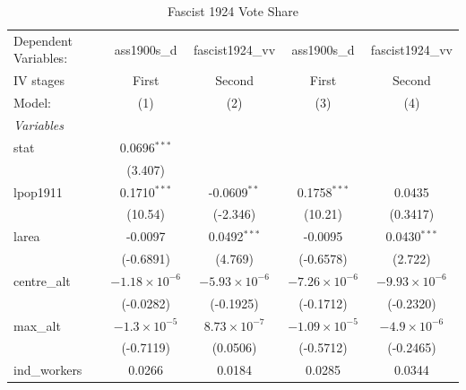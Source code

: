 
\begin{table}[htbp]
   \caption{Fascist 1924 Vote Share}
   \centering
   \begin{tabular}{lcccc}
      \tabularnewline \midrule \midrule
      Dependent Variables:             & ass1900s\_d            & fascist1924\_vv        & ass1900s\_d            & fascist1924\_vv\\   
      IV stages                        & First                  & Second                 & First                  & Second \\   
      Model:                           & (1)                    & (2)                    & (3)                    & (4)\\  
      \midrule
      \emph{Variables}\\
      stat                             & 0.0696$^{***}$         &                        &                        &   \\   
                                       & (3.407)                &                        &                        &   \\   
      lpop1911                         & 0.1710$^{***}$         & -0.0609$^{**}$         & 0.1758$^{***}$         & 0.0435\\   
                                       & (10.54)                & (-2.346)               & (10.21)                & (0.3417)\\   
      larea                            & -0.0097                & 0.0492$^{***}$         & -0.0095                & 0.0430$^{***}$\\   
                                       & (-0.6891)              & (4.769)                & (-0.6578)              & (2.722)\\   
      centre\_alt                      & $-1.18\times 10^{-6}$  & $-5.93\times 10^{-6}$  & $-7.26\times 10^{-6}$  & $-9.93\times 10^{-6}$\\    
                                       & (-0.0282)              & (-0.1925)              & (-0.1712)              & (-0.2320)\\   
      max\_alt                         & $-1.3\times 10^{-5}$   & $8.73\times 10^{-7}$   & $-1.09\times 10^{-5}$  & $-4.9\times 10^{-6}$\\    
                                       & (-0.7119)              & (0.0506)               & (-0.5712)              & (-0.2465)\\   
      ind\_workers                     & 0.0266                 & 0.0184                 & 0.0285                 & 0.0344\\   

\end{tabular}
\end{table}
